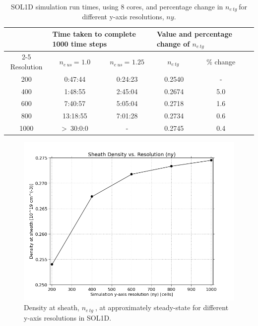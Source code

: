 \documentclass[12pt]{article}  %
\providecommand{\neus}{$n_{e~us}~$} %
\providecommand{\netg}{$n_{e~tg}~$} %
\begin{document}
\begin{table}[]
	\centering
	\caption{SOL1D simulation run times, using 8 cores, and percentage change in \netg for different y-axis resolutions, $ny$.}
	\label{tabsol1dres}
	\begin{tabular}{c|c|c|c|c|c}
		\multicolumn{1}{l|}{\multirow{2}{*}{}}   & \multicolumn{2}{l|}{Time taken to complete 1000 time steps}  & \multicolumn{2}{l|}{Value and percentage change of \netg} \\ \cline{2-5} 
		Resolution          & \neus = $1.0$ & \neus = $1.25$  & \netg & \% change  \\ \hline
		200                 &      0:47:44          &    0:24:23        &  0.2540  &   -    \\
		400                 &      1:48:55          &    2:45:04        &  0.2674  &  5.0   \\
		600                 &      7:40:57          &    5:05:04        &  0.2718  &  1.6   \\
		800                 &     13:18:55          &    7:01:28        &  0.2734  &  0.6   \\
	   1000                 &  \textgreater~30:0:0  &       -           &  0.2745  &  0.4
	\end{tabular}
\end{table}

\begin{figure}
	\includegraphics[scale=0.48]{Figures/sol1d/RE_neres1000.png}
	\centering
	\caption{Density at sheath, \netg, at approximately steady-state for different y-axis resolutions in SOL1D.}\label{figRE_neres1000}
\end{figure}
\end{document}
